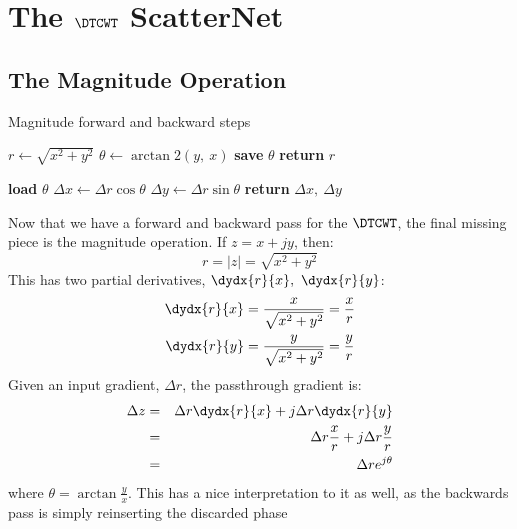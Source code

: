\section{The $\DTCWT$ ScatterNet}\label{sec:ch3:scat}
\subsection{The Magnitude Operation}\label{sec:ch3:mag}

\begin{algorithm}[tb]
\caption{Magnitude forward and backward steps}\label{alg:ch3:mag}
\begin{algorithmic}[1]
  \State $r \gets \sqrt{x^2 + y^2}$
  \State $\theta \gets \arctan2(y,\ x)$ 
  \State \textbf{save} $\theta$
  \State \textbf{return} $r$
\EndFunction
\end{algorithmic}\vspace{10pt}
\begin{algorithmic}[1]
  \State \textbf{load} $\theta$
  \State $\Delta x \gets \Delta r \cos{\theta}$ 
  \State $\Delta y \gets \Delta r \sin{\theta}$ 
  \State \textbf{return} $\Delta x,\ \Delta y$
\EndFunction
\end{algorithmic}
\end{algorithm}
Now that we have a forward and backward pass for the $\DTCWT$, the final missing
piece is the magnitude operation. If $z = x + jy$, then:
%
\begin{equation}
  r = |z| =  \sqrt{x^2 + y^2}
\end{equation}
%
This has two partial derivatives, $\dydx{r}{x},\ \dydx{r}{y}$:
\begin{align}
  \dydx{r}{x} & =  \frac{x}{\sqrt{x^2 + y^2}} = \frac{x}{r}\\
  \dydx{r}{y} & =  \frac{y}{\sqrt{x^2 + y^2}} = \frac{y}{r}
\end{align}
Given an input gradient, $\Delta r$, the passthrough gradient is:
\begin{eqnarray}
  \Delta z & = & \Delta r \dydx{r}{x} + j\Delta r \dydx{r}{y} \\
           &= & \Delta r \frac{x}{r} + j\Delta r \frac{y}{r} \\
           &=& \Delta r e^{j\theta}
\end{eqnarray}
where $\theta = \arctan{\frac{y}{x}}$. This has a nice interpretation to it as
well, as the backwards pass is simply reinserting the discarded phase
